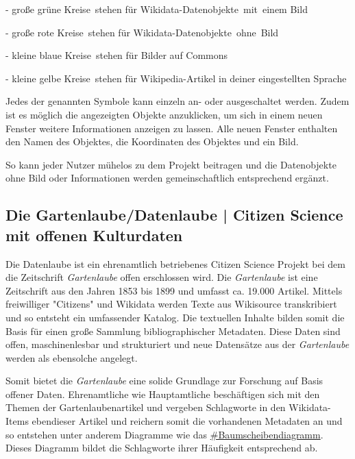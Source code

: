 \documentclass{article}
\begin{document}
- große grüne Kreise stehen für Wikidata-Datenobjekte mit einem Bild

- große rote Kreise stehen für Wikidata-Datenobjekte ohne Bild

- kleine blaue Kreise stehen für Bilder auf Commons

- kleine gelbe Kreise stehen für Wikipedia-Artikel in deiner eingestellten Sprache


Jedes der genannten Symbole kann einzeln an- oder ausgeschaltet werden. Zudem ist es möglich die angezeigten Objekte anzuklicken, um sich in einem neuen Fenster weitere Informationen anzeigen zu lassen. Alle neuen Fenster enthalten den Namen des Objektes, die Koordinaten des Objektes und ein Bild. \autocite{Wikimedia}


So kann jeder Nutzer mühelos zu dem Projekt beitragen und die Datenobjekte ohne Bild oder Informationen werden gemeinschaftlich entsprechend ergänzt.


\subsection{Die Gartenlaube/Datenlaube | Citizen Science mit offenen Kulturdaten}\label{H316072}



Die Datenlaube ist ein ehrenamtlich betriebenes Citizen Science Projekt bei dem die Zeitschrift \emph{Gartenlaube} offen erschlossen wird. Die \emph{Gartenlaube} ist eine Zeitschrift aus den Jahren 1853 bis 1899 und umfasst ca. 19.000 Artikel. Mittels freiwilliger "Citizens" und Wikidata werden Texte aus Wikisource transkribiert und so entsteht ein umfassender Katalog. Die textuellen Inhalte bilden somit die Basis für einen große Sammlung bibliographischer Metadaten. Diese Daten sind offen, maschinenlesbar und strukturiert und neue Datensätze aus der \emph{Gartenlaube} werden als ebensolche angelegt. \autocite{BemmeJens2021}


Somit bietet die \emph{Gartenlaube }eine solide Grundlage zur Forschung auf Basis offener Daten. Ehrenamtliche wie Hauptamtliche beschäftigen sich mit den Themen der Gartenlaubenartikel und vergeben Schlagworte in den Wikidata-Items ebendieser Artikel und reichern somit die vorhandenen Metadaten an und so entstehen unter anderem Diagramme wie das \href{https://query.wikidata.org/embed.html#%23defaultView%3ABubbleChart%0ASELECT%20%20%3FSchlagwort%20%3FSchlagwortLabel%20(COUNT(%3FDie_Gartenlaube)%20AS%20%3Fanzahl)%20WHERE%20%7B%0A%20%20SERVICE%20wikibase%3Alabel%20%7B%20bd%3AserviceParam%20wikibase%3Alanguage%20%22%5BAUTO_LANGUAGE%5D%2Cen%22.%20%7D%0A%20%20%3FDie_Gartenlaube%20wdt%3AP1433%20wd%3AQ655617.%0A%20%20%3FDie_Gartenlaube%20wdt%3AP921%20%3FSchlagwort.%20%0A%0A%7D%0AGROUP%20BY%20%3FSchlagwort%20%3FSchlagwortLabel%0AORDER%20BY%20DESC(%3Fanzahl)}{\#Baumscheibendiagramm}. Dieses Diagramm bildet die Schlagworte ihrer Häufigkeit entsprechend ab.
\end{document}
